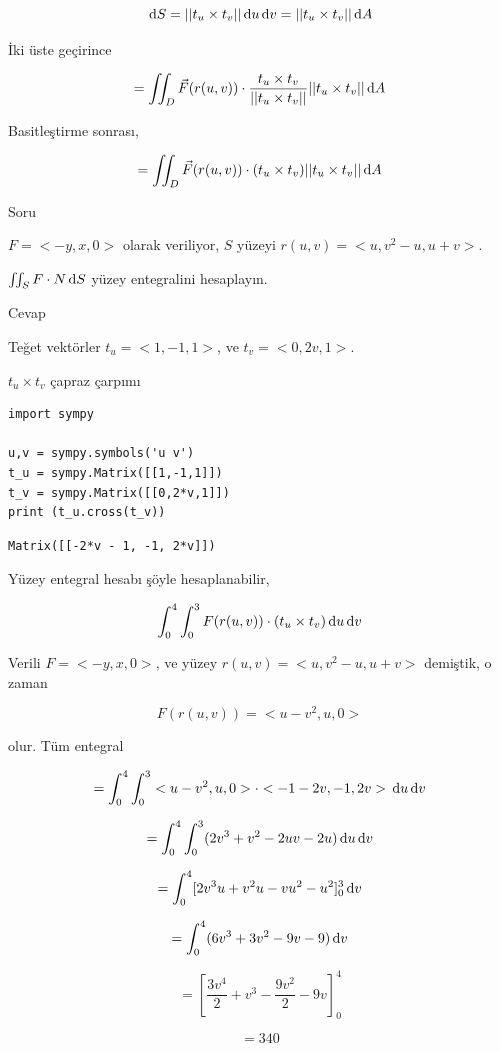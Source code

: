 \documentclass[12pt,fleqn]{article}\usepackage{../../common}
\begin{document}
$$
\,\mathrm{d} S = || t_u \times t_v || \,\mathrm{d} u \,\mathrm{d} v = || t_u \times t_v || \,\mathrm{d} A
$$

İki üste geçirince

$$
= \iint_D \vec{F}(r(u,v)) \cdot \frac{t_u \times t_v}{ || t_u \times t_v || }
|| t_u \times t_v || \,\mathrm{d} A
$$

Basitleştirme sonrası,

$$
= \iint_D \vec{F}(r(u,v)) \cdot (t_u \times t_v) || t_u \times t_v || \,\mathrm{d} A
$$

Soru

$F = < -y, x, 0 >$ olarak veriliyor, $S$ yüzeyi $r(u,v) = < u, v^2 - u, u+v >$.

$\iint_S F \cdot N \,\mathrm{d} S$ yüzey entegralini hesaplayın.

Cevap

Teğet vektörler $t_u = < 1, -1, 1 >$, ve $t_v = < 0, 2v, 1 >$.

$t_u \times t_v$ çapraz çarpımı

\begin{verbatim}
import sympy

u,v = sympy.symbols('u v')
t_u = sympy.Matrix([[1,-1,1]])
t_v = sympy.Matrix([[0,2*v,1]])
print (t_u.cross(t_v))
\end{verbatim}

\begin{verbatim}
Matrix([[-2*v - 1, -1, 2*v]])
\end{verbatim}

Yüzey entegral hesabı şöyle hesaplanabilir,

$$
\int _{0}^{4} \int _{0}^{3} F(r(u,v)) \cdot (t_u \times t_v) \,\mathrm{d} u \,\mathrm{d} v
$$

Verili $F = < -y, x, 0 >$, ve yüzey $r(u,v) = < u, v^2 - u, u+v >$ demiştik,
o zaman 

$$
F(r(u,v)) = < u-v^2, u, 0 > 
$$

olur. Tüm entegral

$$
= \int _{0}^{4} \int _{0}^{3} < u-v^2, u, 0 >  \cdot < -1-2v, -1, 2v >
\,\mathrm{d} u \,\mathrm{d} v
$$

$$
= \int_{0}^{4} \int_{0}^{3} (2v^3 + v^2 -2uv -2u )
\,\mathrm{d} u \,\mathrm{d} v
$$

$$
= \int_{0}^{4} [ 2v^3u + v^2u - vu^2 - u^2 ]_{0}^{3} \,\mathrm{d} v
$$

$$
= \int_{0}^{4} (6v^3 + 3v^2 - 9v -9 ) \,\mathrm{d} v
$$

$$
= \left[ \frac{3v^4}{2} + v^3 - \frac{9v^2}{2} - 9v \right]_{0}^{4}
$$

$$
= 340
$$
\end{document}
